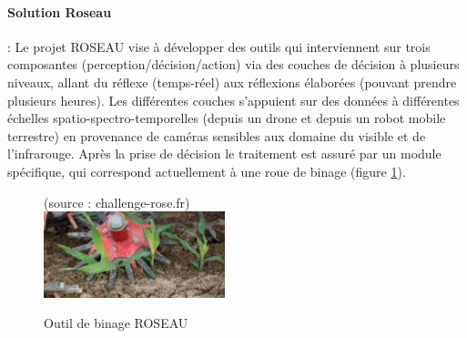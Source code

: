\documentclass[../thesis.tex]{subfiles}
\begin{document}
    \paragraph{Solution Roseau} : Le projet ROSEAU vise à développer des outils qui interviennent sur trois composantes (perception/décision/action) via des couches de décision à plusieurs niveaux, allant du réflexe (temps-réel) aux réflexions élaborées (pouvant prendre plusieurs heures). Les différentes couches s'appuient sur des données à différentes échelles spatio-spectro-temporelles (depuis un drone et depuis un robot mobile terrestre) en provenance de caméras sensibles aux domaine du visible et de l'infrarouge. Après la prise de décision le traitement est assuré par un module spécifique, qui correspond actuellement à une roue de binage (figure \ref{fig:02-anr-roseau}). %
    
    \begin{figure}[H]
        \centering
        {\scriptsize (source : challenge-rose.fr)} \\
        \includegraphics[height=2.5cm]{img/intro/anr-roseau}
        \caption{Outil de binage ROSEAU}
        \label{fig:02-anr-roseau}
    \end{figure}
    
    
\end{document}
